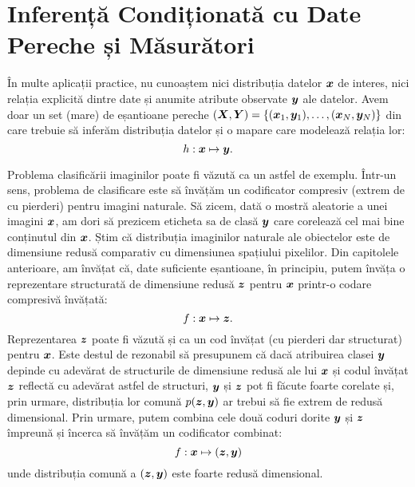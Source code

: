 \documentclass[../../book-main_ro.tex]{subfiles}
\begin{document}
\section{Inferență Condiționată cu Date Pereche și Măsurători}
În multe aplicații practice, nu cunoaștem nici distribuția datelor $\bm{x}$ de interes, nici relația explicită dintre date și anumite atribute observate $\bm{y}$ ale datelor. Avem doar un set (mare) de eșantioane pereche $(\bm{X}, \bm{Y}) = \{ (\bm{x}_1, \bm{y}_1), \ldots, (\bm{x}_N, \bm{y}_N) \}$ din care trebuie să inferăm distribuția datelor și o mapare care modelează relația lor:
\begin{equation}
  h: \bm{x} \mapsto \bm{y}.
\end{equation}

Problema clasificării imaginilor poate fi văzută ca un astfel de exemplu. Într-un sens, problema de clasificare este să învățăm un codificator compresiv (extrem de cu pierderi) pentru imagini naturale. Să zicem, dată o mostră aleatorie a unei imagini $\bm{x}$, am dori să prezicem eticheta sa de clasă $\bm{y}$ care corelează cel mai bine conținutul din $\bm{x}$. Știm că distribuția imaginilor naturale ale obiectelor este de dimensiune redusă comparativ cu dimensiunea spațiului pixelilor. Din capitolele anterioare, am învățat că, date suficiente eșantioane, în principiu, putem învăța o reprezentare structurată de dimensiune redusă $\bm{z}$ pentru $\bm{x}$ printr-o codare compresivă învățată:
\begin{equation}
    f: \bm{x} \mapsto \bm{z}. 
\end{equation}
Reprezentarea $\bm{z}$ poate fi văzută și ca un cod învățat (cu pierderi dar structurat) pentru $\bm{x}$. Este destul de rezonabil să presupunem că dacă atribuirea clasei $\bm{y}$ depinde cu adevărat de structurile de dimensiune redusă ale lui $\bm{x}$ și codul învățat $\bm{z}$ reflectă cu adevărat astfel de structuri, $\bm{y}$ și $\bm{z}$ pot fi făcute foarte corelate și, prin urmare, distribuția lor comună $p(\bm{z}, \bm{y})$ ar trebui să fie extrem de redusă dimensional. Prin urmare, putem combina cele două coduri dorite $\bm{y}$ și $\bm{z}$ împreună și încerca să învățăm un codificator combinat:
\begin{equation}
    f: \bm{x} \mapsto (\bm{z}, \bm{y}) 
\end{equation}
unde distribuția comună a $(\bm{z}, \bm{y})$ este foarte redusă dimensional.
\end{document}
